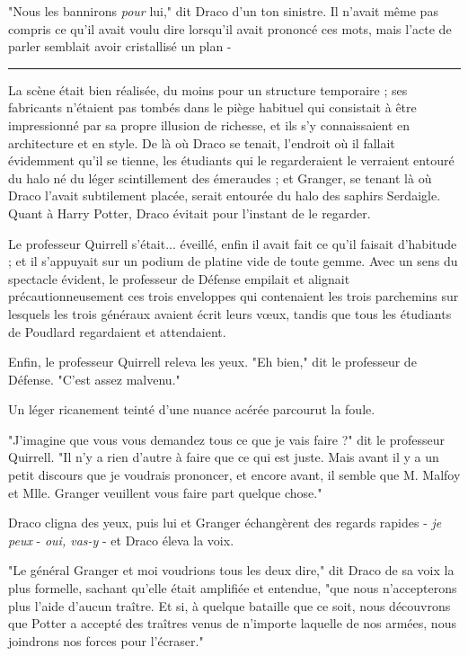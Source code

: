 "Nous les bannirons \emph{pour}  lui," dit Draco d'un ton sinistre. Il n'avait même pas compris ce qu'il avait voulu dire lorsqu'il avait prononcé ces mots, mais l'acte de parler semblait avoir cristallisé un plan -
\par\noindent\rule{\textwidth}{0.4pt}
La scène était bien réalisée, du moins pour un structure temporaire ; ses fabricants n'étaient pas tombés dans le piège habituel qui consistait à être impressionné par sa propre illusion de richesse, et ils s'y connaissaient en architecture et en style. De là où Draco se tenait, l'endroit où il fallait évidemment qu'il se tienne, les étudiants qui le regarderaient le verraient entouré du halo né du léger scintillement des émeraudes ; et Granger, se tenant là où Draco l'avait subtilement placée, serait entourée du halo des saphirs Serdaigle. Quant à Harry Potter, Draco évitait pour l'instant de le regarder.

Le professeur Quirrell s'était... éveillé, enfin il avait fait ce qu'il faisait d'habitude ; et il s'appuyait sur un podium de platine vide de toute gemme. Avec un sens du spectacle évident, le professeur de Défense empilait et alignait précautionneusement ces trois enveloppes qui contenaient les trois parchemins sur lesquels les trois généraux avaient écrit leurs vœux, tandis que tous les étudiants de Poudlard regardaient et attendaient.

Enfin, le professeur Quirrell releva les yeux. "Eh bien," dit le professeur de Défense. "C'est assez malvenu."

Un léger ricanement teinté d'une nuance acérée parcourut la foule.

"J'imagine que vous vous demandez tous ce que je vais faire ?" dit le professeur Quirrell. "Il n'y a rien d'autre à faire que ce qui est juste. Mais avant il y a un petit discours que je voudrais prononcer, et encore avant, il semble que M. Malfoy et Mlle. Granger veuillent vous faire part quelque chose."

Draco cligna des yeux, puis lui et Granger échangèrent des regards rapides - \emph{je peux}  - \emph{oui, vas-y}  - et Draco éleva la voix.

"Le général Granger et moi voudrions tous les deux dire," dit Draco de sa voix la plus formelle, sachant qu'elle était amplifiée et entendue, "que nous n'accepterons plus l'aide d'aucun traître. Et si, à quelque bataille que ce soit, nous découvrons que Potter a accepté des traîtres venus de n'importe laquelle de nos armées, nous joindrons nos forces pour l'écraser."

